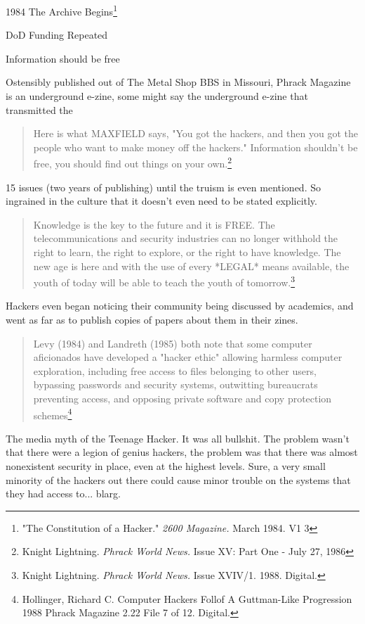\documentclass[11pt]{article}
\begin{document}
1984 The Archive Begins\footnote{"The Constitution of a Hacker." \emph{2600 Magazine.} March 1984. V1 3}

DoD Funding Repeated

Information should be free

Ostensibly published out of The Metal Shop BBS in Missouri, Phrack Magazine is an underground e-zine, some might say the underground e-zine that transmitted the 
\begin{quote}
Here is what MAXFIELD says, "You got the hackers, and then you got the
people who want to make money off the hackers." Information shouldn't
be free, you should find out things on your own.\footnote{Knight Lightning. \emph{Phrack World News.} Issue XV: Part One -  July 27, 1986}

\end{quote}

15 issues (two years of publishing) until the truism is even mentioned. So ingrained in the culture that it doesn’t even need to be stated explicitly.
\begin{quote}Knowledge is the key to the future and it is FREE. The telecommunications and
security industries can no longer withhold the right to learn, the right to
explore, or the right to have knowledge. The new age is here and with the use
of every *LEGAL* means available, the youth of today will be able to teach the
youth of tomorrow.\footnote{Knight Lightning.\emph{ Phrack World News.} Issue XVIV/1. 1988. Digital.}\end{quote}

Hackers even began noticing their community being discussed by academics, and went as far as to publish copies of papers about them in their zines.

\begin{quote}Levy (1984) and Landreth (1985) both note that some computer aficionados have
developed a "hacker ethic" allowing harmless computer exploration, including
free access to files belonging to other users, bypassing passwords and security
systems, outwitting bureaucrats preventing access, and opposing private
software and copy protection schemes\footnote{Hollinger, Richard C. Computer Hackers Follof A Guttman-Like Progression 1988 Phrack Magazine 2.22 File 7 of 12. Digital.}\end{quote}

The media myth of the Teenage Hacker. It was all bullshit. The problem wasn't that there were a legion of genius hackers, the problem was that there was almost nonexistent security in place, even at the highest levels. Sure, a very small minority of the hackers out there could cause minor trouble on the systems that they had access to...  blarg.
\end{document}
